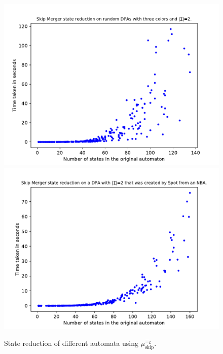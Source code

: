 \begin{figure}
\begin{minipage}{0.49\textwidth}
		\caption{State reduction of different automata using $\mu_\text{skip}^{\equiv_L}$.}
		\label{fig:skip:empirical_size_hist}
	\end{minipage}
	\hfill
	\begin{minipage}{0.49\textwidth}
		\includegraphics[page=2,height=.3\textheight]{../data/analysis/skipper/gendet_ap1.pdf} 
		\includegraphics[page=2,height=.3\textheight]{../data/analysis/skipper/detspot_ap1.pdf} 

\end{minipage}
\end{figure}

